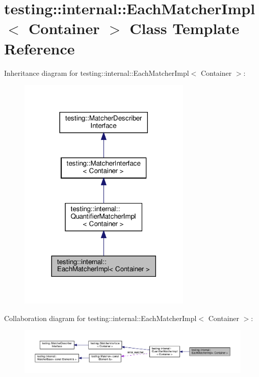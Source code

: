 \hypertarget{classtesting_1_1internal_1_1_each_matcher_impl}{}\section{testing\+:\+:internal\+:\+:Each\+Matcher\+Impl$<$ Container $>$ Class Template Reference}
\label{classtesting_1_1internal_1_1_each_matcher_impl}


Inheritance diagram for testing\+:\+:internal\+:\+:Each\+Matcher\+Impl$<$ Container $>$\+:
\nopagebreak
\begin{figure}[H]
\begin{center}
\leavevmode
\includegraphics[width=233pt]{classtesting_1_1internal_1_1_each_matcher_impl__inherit__graph}
\end{center}
\end{figure}


Collaboration diagram for testing\+:\+:internal\+:\+:Each\+Matcher\+Impl$<$ Container $>$\+:
\nopagebreak
\begin{figure}[H]
\begin{center}
\leavevmode
\includegraphics[width=350pt]{classtesting_1_1internal_1_1_each_matcher_impl__coll__graph}
\end{center}
\end{figure}
